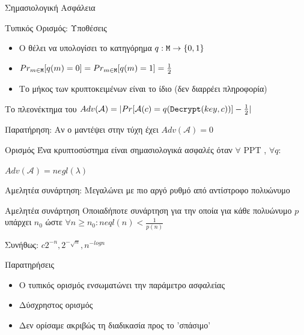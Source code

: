 \documentclass[handout]{beamer}
\begin{document}
\begin{frame}[allowframebreaks]{Σημασιολογική Ασφάλεια}
\framebreak

Τυπικός Ορισμός: Υποθέσεις
\begin{itemize}
\item O \adv θέλει να υπολογίσει το κατηγόρημα $q: \mathtt{M} \rightarrow \{0,1\}$
\item $Pr_{m \in \mathtt{M}}[q(m)=0]=Pr_{m \in \mathtt{M}}[q(m)=1]=\frac{1}{2}$
\item Το μήκος των κρυπτοκειμένων είναι το ίδιο (δεν διαρρέει πληροφορία)
\end{itemize}

\begin{block}{Το πλεονέκτημα του \adv}
$Adv(\mathcal{A}) = |Pr[\mathcal{A}(c)=q(\mathtt{Decrypt}(key,c))]-\frac{1}{2}|$
\end{block}

Παρατήρηση: Αν ο \adv μαντέψει στην τύχη έχει $Adv(\mathcal{A})=0$
\framebreak

\begin{block}{Ορισμός}
Ένα κρυπτοσύστημα είναι σημασιολογικά ασφαλές όταν $\forall$ PPT \adv, $\forall q$:
\begin{center}
$Adv(\mathcal{A})=negl(\lambda)$
\end{center}
\end{block}

Αμελητέα συνάρτηση: Μεγαλώνει με πιο αργό ρυθμό από αντίστροφο πολυώνυμο

\framebreak

\begin{block}{Αμελητέα συνάρτηση}
Οποιαδήποτε συνάρτηση για την οποία για κάθε πολυώνυμο $p$ υπάρχει $n_0$ ώστε $\forall n \geq n_0: neql(n)<\frac{1}{p(n)}$
\end{block}

Συνήθως: $c2^{-n},2^{-\sqrt{n}},n^{-log{n}} $
 
\begin{block}{Παρατηρήσεις}
\begin{itemize}
\item Ο τυπικός ορισμός ενσωματώνει την παράμετρο ασφαλείας
\item Δύσχρηστος ορισμός
\item Δεν ορίσαμε ακριβώς τη διαδικασία προς το 'σπάσιμο'
\end{itemize}
\end{block}
\end{frame}
\end{document}
